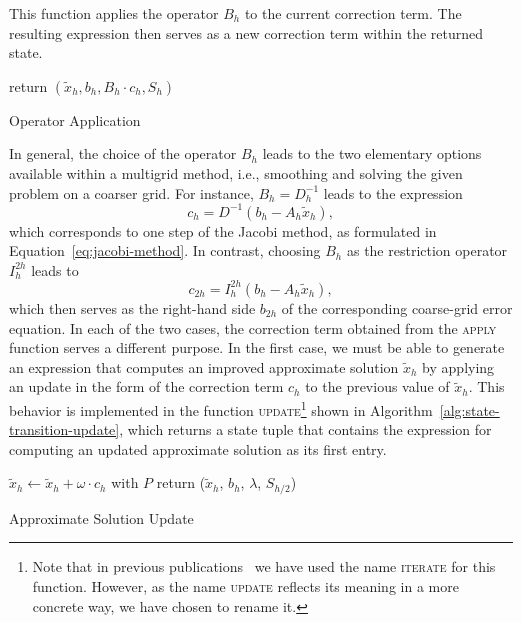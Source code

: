 This function applies the operator $B_h$ to the current correction term. 
The resulting expression then serves as a new correction term within the returned state.
\begin{algorithm}
	\begin{algorithmic}
		\State return $(\tilde{x}_h, b_h, B_h\cdot c_h, S_h)$
		\EndFunction
	\end{algorithmic}
\caption{Operator Application}
\label{alg:state-transition-apply}
\end{algorithm}
In general, the choice of the operator $B_h$ leads to the two elementary options available within a multigrid method, i.e., smoothing and solving the given problem on a coarser grid.
For instance, $B_h = D_h^{-1}$ leads to the expression
\begin{equation*}
	c_h = D^{-1} (b_h - A_h \tilde{x}_h),
\end{equation*}
which corresponds to one step of the Jacobi method, as formulated in Equation~\eqref{eq:jacobi-method}.
In contrast, choosing $B_h$ as the restriction operator $I_h^{2h}$ leads to
\begin{equation*}
	c_{2h} = I_{h}^{2h} (b_h - A_h \tilde{x}_h),
\end{equation*}
which then serves as the right-hand side $b_{2h}$ of the corresponding coarse-grid error equation.
In each of the two cases, the correction term obtained from the \textsc{apply} function serves a different purpose.
In the first case, we must be able to generate an expression that computes an improved approximate solution $\tilde{x}_h$ by applying an update in the form of the correction term $c_h$ to the previous value of $\tilde{x}_h$. 
This behavior is implemented in the function \textsc{update}\footnote{Note that in previous publications~\cite{schmitt2020constructing,schmitt2021evostencils} we have used the name \textsc{iterate} for this function. However, as the name \textsc{update} reflects its meaning in a more concrete way, we have chosen to rename it.} shown in Algorithm~\ref{alg:state-transition-update}, which returns a state tuple that contains the expression for computing an updated approximate solution as its first entry.
\begin{algorithm}
	\begin{algorithmic}
		\Function{update}{$\omega$, $P$, ($\tilde{x}_h$, $b_h$, $c_h$, $S_{h/2}$)}
			\State $\tilde{x}_h \gets \tilde{x}_h + \omega \cdot c_h$ with $P$
			\State return ($\tilde{x}_h$, $b_h$, $\lambda$, $S_{h/2}$) 
		\EndFunction
	\end{algorithmic}
 \caption{Approximate Solution Update}
\label{alg:state-transition-update}
\end{algorithm}
